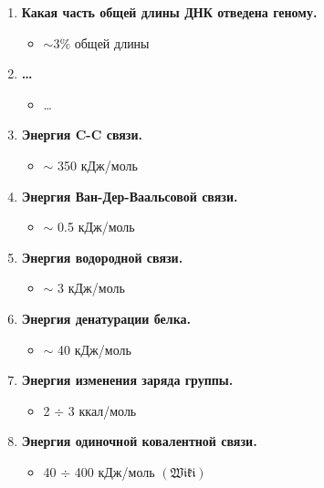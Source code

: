 \documentclass[11pt,twocolumn]{report}
\newcommand{\Wiki}[0]{$\mathfrak{(Wiki)}$}
\begin{document}
\begin{enumerate}
\item \textbf{Какая часть общей длины ДНК отведена геному.}
\begin{itemize}
    \item $\sim$3\% общей длины
\end{itemize}
\pagebreak[2]

\item \textbf{\ldots}
\begin{itemize}
    \item \ldots
\end{itemize}
\pagebreak[2]

\item \textbf{Энергия C-C связи.}
\begin{itemize}
    \item $\sim$ 350 кДж/моль
\end{itemize}
\pagebreak[2]

\item \textbf{Энергия Ван-Дер-Ваальсовой связи.}
\begin{itemize}
    \item $\sim$ 0.5 кДж/моль
\end{itemize}
\pagebreak[2]

\item \textbf{Энергия водородной связи.}
\begin{itemize}
    \item $\sim$ 3 кДж/моль
\end{itemize}
\pagebreak[2]

\item \textbf{Энергия денатурации белка.}
\begin{itemize}
    \item $\sim$ 40 кДж/моль
\end{itemize}
\pagebreak[2]

\item \textbf{Энергия изменения заряда группы.}
\begin{itemize}
    \item 2 $\div$ 3 ккал/моль
\end{itemize}
\pagebreak[2]

\item \textbf{Энергия одиночной ковалентной связи.}
\begin{itemize}
    \item 40 $\div$ 400 кДж/моль \Wiki
\end{itemize}
\pagebreak[2]


\end{enumerate}
\end{document}
